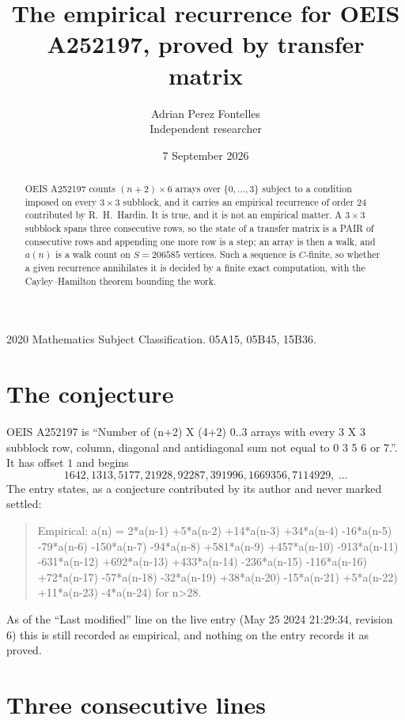 \documentclass[11pt,a4paper]{article}
\title{The empirical recurrence for OEIS A252197, proved by transfer matrix}
\author{Adrian Perez Fontelles\\ \small Independent researcher}
\date{7 September 2026}
\theoremstyle{plain}
\theoremstyle{definition}
\begin{document}
\maketitle

\begin{abstract}
OEIS A252197 counts $(n+2)\times6$ arrays over $\{0,\dots,3\}$ subject to a condition imposed on
every $3\times3$ subblock, and it carries an empirical recurrence of order $24$
contributed by R.~H.~Hardin. It is true, and it is not an empirical matter. A $3\times3$
subblock spans three consecutive rows, so the state of a transfer matrix is a PAIR of
consecutive rows and appending one more row is a step; an array is then a walk, and
$a(n)$ is a walk count on $S=206585$ vertices. Such a sequence is $C$-finite, so whether a given
recurrence annihilates it is decided by a finite exact computation, with the Cayley--Hamilton
theorem bounding the work.
\end{abstract}

\noindent\small 2020 Mathematics Subject Classification. 05A15, 05B45, 15B36.\normalsize

\section{The conjecture}

OEIS A252197 is ``Number of (n+2) X (4+2) 0..3 arrays with every 3 X 3 subblock row, column, diagonal and antidiagonal sum not equal to 0 3 5 6 or 7.''. It has offset $1$ and begins
\[
1642, 1313, 5177, 21928, 92287, 391996, 1669356, 7114929,\ \dots
\]
The entry states, as a conjecture contributed by its author and never marked settled:
\begin{quote}
Empirical: a(n) = 2*a(n-1) +5*a(n-2) +14*a(n-3) +34*a(n-4) -16*a(n-5) -79*a(n-6) -150*a(n-7) -94*a(n-8) +581*a(n-9) +457*a(n-10) -913*a(n-11) -631*a(n-12) +692*a(n-13) +433*a(n-14) -236*a(n-15) -116*a(n-16) +72*a(n-17) -57*a(n-18) -32*a(n-19) +38*a(n-20) -15*a(n-21) +5*a(n-22) +11*a(n-23) -4*a(n-24) for n>28.
\end{quote}
As of the ``Last modified'' line on the live entry (May 25 2024 21:29:34, revision 6) this is still
recorded as empirical, and nothing on the entry records it as proved.

\section{Three consecutive lines}
\end{document}
